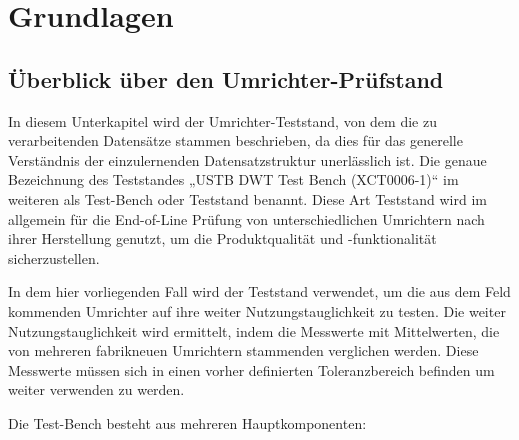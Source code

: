 
\newpage
\section{Grundlagen}
\label{Grundlagen}

\subsection{Überblick über den Umrichter-Prüfstand}
In diesem Unterkapitel wird der Umrichter-Teststand, von dem die zu verarbeitenden Datensätze stammen beschrieben,
da dies für das generelle Verständnis der einzulernenden Datensatzstruktur unerlässlich ist.
Die genaue Bezeichnung des Teststandes „USTB DWT Test Bench (XCT0006-1)“ im weiteren als Test-Bench oder Teststand benannt.
Diese Art Teststand wird im allgemein für die End-of-Line Prüfung von unterschiedlichen Umrichtern nach ihrer Herstellung genutzt,
um die Produktqualität und -funktionalität sicherzustellen.

In dem hier vorliegenden Fall wird der Teststand verwendet, um die aus dem Feld kommenden Umrichter auf ihre weiter Nutzungstauglichkeit zu testen.
Die weiter Nutzungstauglichkeit wird ermittelt, indem die Messwerte mit Mittelwerten, die von mehreren fabrikneuen Umrichtern stammenden verglichen werden.
Diese Messwerte müssen sich in einen vorher definierten Toleranzbereich befinden um weiter verwenden zu werden.

Die Test-Bench besteht aus mehreren Hauptkomponenten:

